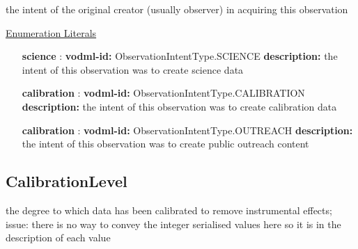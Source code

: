   the intent of the original creator (usually observer) in acquiring this observation

  \noindent \underline{Enumeration Literals}
  \vspace{-\parsep}
  \small
  \begin{itemize}
  
    \item[\textbf{science}]: \textbf{vodml-id:} ObservationIntentType.SCIENCE \newline
          \textbf{description:} the intent of this observation was to create science data
    \item[\textbf{calibration}]: \textbf{vodml-id:} ObservationIntentType.CALIBRATION \newline
          \textbf{description:} the intent of this observation was to create calibration data
    \item[\textbf{calibration}]: \textbf{vodml-id:} ObservationIntentType.OUTREACH \newline
          \textbf{description:} the intent of this observation was to create public outreach content
  \end{itemize}
  \normalsize


  \subsection{CalibrationLevel}
  \label{sect:CalibrationLevel}

  the degree to which data has been calibrated to remove instrumental effects; issue: there is no way to convey the integer serialised values here so it is in the description of each value

